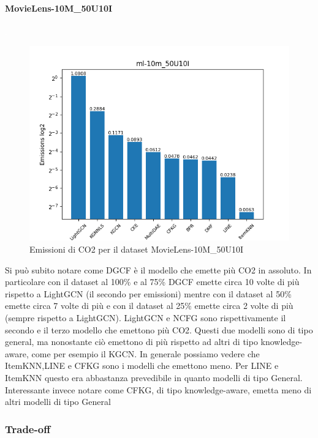 \paragraph{MovieLens-10M\_50U10I} \textcolor{white}{.} \\
\begin{figure}[H]
    \centering
    \includegraphics[scale=0.75]{images/emissions_ml-10m_50U10I.png}
    \caption{Emissioni di CO2 per il dataset MovieLens-10M\_50U10I}
\end{figure}

\noindent Si può subito notare come DGCF è il modello che emette più CO2 in assoluto.
In particolare con il dataset al 100\% e al 75\% DGCF emette circa 10 volte di più rispetto a LightGCN (il secondo per emissioni)
mentre con il dataset al 50\% emette circa 7 volte di più e con il dataset al 25\% emette circa 2 volte di più (sempre rispetto a LightGCN).
LightGCN e NCFG sono rispettivamente il secondo e il terzo modello che emettono più CO2.
Questi due modelli sono di tipo general, ma nonostante ciò emettono di più rispetto ad altri di tipo knowledge-aware, come per esempio il KGCN.
In generale possiamo vedere che ItemKNN,LINE e CFKG sono i modelli che emettono meno.
Per LINE e ItemKNN questo era abbastanza prevedibile in quanto modelli di tipo General. Interessante invece notare come CFKG, di tipo knowledge-aware, emetta meno di altri modelli di tipo General

\subsubsection{Trade-off}

